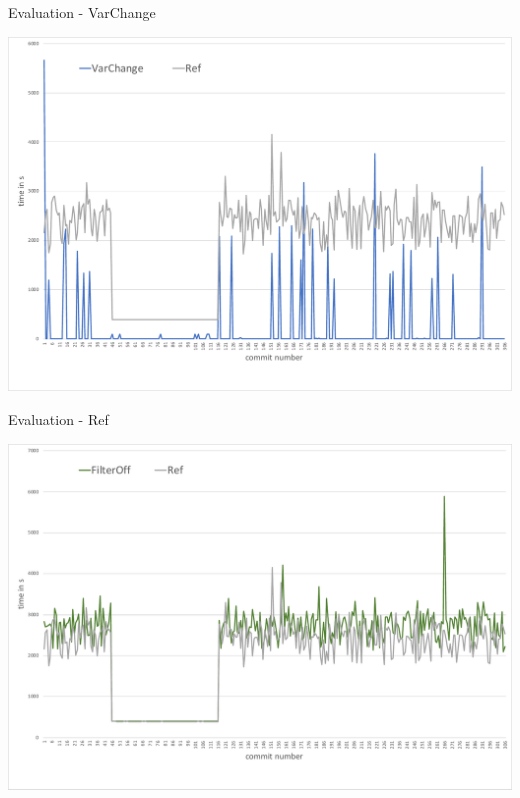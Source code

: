 \documentclass[aspectratio=43, noserifmath]{beamer}
\begin{document}
\begin{frame}{Evaluation - VarChange}

\includegraphics[width=1\textwidth]{image/var-change-vs-ref}

\end{frame}

\begin{frame}{Evaluation - Ref}

\includegraphics[width=1\textwidth]{image/filteroff-vs-ref}

\end{frame}
\end{document}
